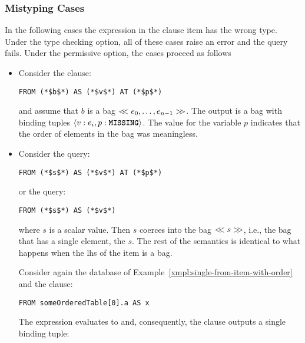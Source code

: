 \subsubsection{Mistyping Cases}
\label{sec:bag-array-mistypings}

In the following cases the expression in the \from clause item has the wrong
type. Under the type checking option, all of these cases raise an error and the
query fails. Under the permissive option, the cases proceed as follows

\begin{itemize}
\item {} Consider the clause:

\begin{lstlisting}
FROM (*$b$*) AS (*$v$*) AT (*$p$*)
\end{lstlisting}

\noindent and assume that $b$ is a bag $<\!\!< e_0, \ldots, e_{n-1} >\!\!>$. The
output is a bag with binding tuples $\langle v: e_i, p: \texttt{\textbf{MISSING}} \rangle$. The
value \MISSING for the variable $p$ indicates that the order of elements in
the bag was meaningless. 

\item {} Consider the query:

\begin{lstlisting}
FROM (*$s$*) AS (*$v$*) AT (*$p$*)
\end{lstlisting}

\noindent or the query:

\begin{lstlisting}
FROM (*$s$*) AS (*$v$*)
\end{lstlisting}
 
\noindent where $s$ is a scalar value. Then $s$ coerces into the bag $<\!\!< s
>\!\!>$, i.e., the bag that has a single element, the $s$. The rest of the
semantics is identical to what happens when the lhs of the \from item is a bag.

\begin{example}
Consider again the database of Example~\ref{xmpl:single-from-item-with-order}
and the \from clause: 

\begin{lstlisting}
FROM someOrderedTable[0].a AS x
\end{lstlisting}

The expression  evaluates to  and,
consequently, the \from clause outputs a single binding tuple:


\end{example}
\end{itemize}
